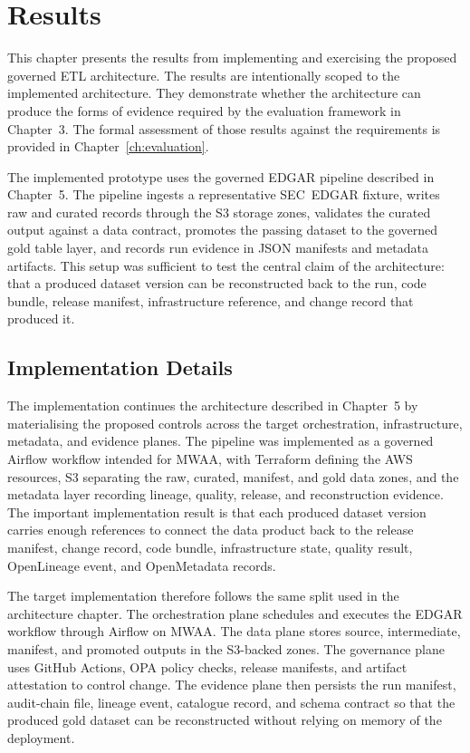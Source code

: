 \chapter{Results}
\label{ch:results}
\noindent
This chapter presents the results from implementing and exercising the proposed
governed ETL architecture. The results are intentionally scoped to the
implemented architecture. They demonstrate whether the architecture can produce
the forms of evidence required by the evaluation framework in Chapter~3. The
formal assessment of those results against the requirements is provided in
Chapter~\ref{ch:evaluation}.

The implemented prototype uses the governed EDGAR pipeline described in
Chapter~5. The pipeline ingests a representative SEC~EDGAR fixture, writes raw
and curated records through the S3 storage zones, validates the curated output
against a data contract, promotes the passing dataset to the governed gold
table layer, and records run evidence in JSON manifests and metadata artifacts.
This setup was sufficient to test the central claim of the architecture: that a
produced dataset version can be reconstructed back to the run, code bundle,
release manifest, infrastructure reference, and change record that produced it.

\section{Implementation Details}
\noindent
The implementation continues the architecture described in Chapter~5 by
materialising the proposed controls across the target orchestration,
infrastructure, metadata, and evidence planes. The pipeline was implemented as a
governed Airflow workflow intended for MWAA, with Terraform defining the AWS
resources, S3 separating the raw, curated, manifest, and gold data zones, and
the metadata layer recording lineage, quality, release, and reconstruction
evidence. The important implementation result is that each produced dataset
version carries enough references to connect the data product back to the
release manifest, change record, code bundle, infrastructure state, quality
result, OpenLineage event, and OpenMetadata records.

The target implementation therefore follows the same split used in the
architecture chapter. The orchestration plane schedules and executes the EDGAR
workflow through Airflow on MWAA. The data plane stores source, intermediate,
manifest, and promoted outputs in the S3-backed zones. The governance plane
uses GitHub Actions, OPA policy checks, release manifests, and artifact
attestation to control change. The evidence plane then persists the run
manifest, audit-chain file, lineage event, catalogue record, and schema
contract so that the produced gold dataset can be reconstructed without relying
on memory of the deployment.

